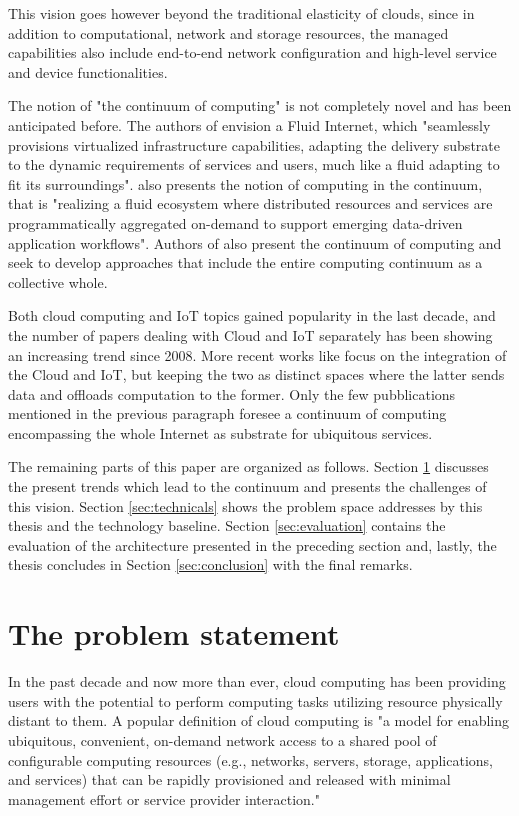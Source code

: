 \documentclass{ieeeaccess}
\begin{document}
This vision goes however beyond the traditional elasticity of clouds, since in addition to computational, network and storage resources, the managed capabilities also include end-to-end network configuration and high-level service and device functionalities.

The notion of "the continuum of computing" is not completely novel and has been anticipated before. The authors of \cite{fluid-internet} envision a Fluid Internet, which "seamlessly provisions virtualized infrastructure capabilities, adapting the delivery substrate to the dynamic requirements of services and users, much like a fluid adapting to fit its surroundings". \cite{computing-in-continuum} also presents the notion of computing in the continuum, that is "realizing a fluid ecosystem where distributed resources and services are programmatically aggregated on-demand to support emerging data-driven application workflows". Authors of \cite{harnessing-continuum} also present the continuum of computing and seek to develop approaches that include the entire computing continuum as a collective whole.

Both cloud computing and IoT topics gained popularity in the last decade, and the number of papers dealing with Cloud and IoT separately has been showing an increasing trend since 2008. More recent works like \cite{cloud-iot} focus on the integration of the Cloud and IoT, but keeping the two as distinct spaces where the latter sends data and offloads computation to the former. Only the few pubblications mentioned in the previous paragraph foresee a continuum of computing encompassing the whole Internet as substrate for ubiquitous services.

The remaining parts of this paper are organized as follows. Section \ref{sec:challenges} discusses the present trends which lead to the continuum and presents the challenges of this vision. Section \ref{sec:technicals} shows the problem space addresses by this thesis and the technology baseline. Section \ref{sec:evaluation} contains the evaluation of the architecture presented in the preceding section and, lastly, the thesis concludes in Section \ref{sec:conclusion} with the final remarks.

\section{The problem statement}
\label{sec:challenges}

In the past decade and now more than ever, cloud computing has been providing users with the potential to perform computing tasks utilizing resource physically distant to them. A popular definition of cloud computing \cite{cloud-def} is "a model for enabling ubiquitous, convenient, on-demand network access to a shared pool of configurable computing resources (e.g., networks, servers, storage, applications, and services) that can be rapidly provisioned and released with minimal management effort or service provider interaction."
\end{document}
